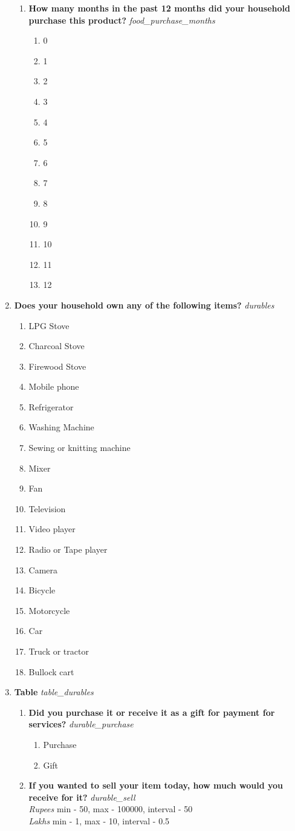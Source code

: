 \documentclass{article}
\begin{document}
\begin{enumerate}
\begin{enumerate}[label*=\arabic*.]
\item {\bfseries How many months in the past 12 months did your household purchase this product?}\emph{ food\_purchase\_months }
\begin{enumerate}
\item 0
\item 1
\item 2
\item 3
\item 4
\item 5
\item 6
\item 7
\item 8
\item 9
\item 10
\item 11
\item 12
\end{enumerate}
\end{enumerate}
\item {\bfseries Does your household own any of the following items?}\emph{ durables }
\begin{enumerate}
\item LPG Stove
\item Charcoal Stove
\item  Firewood Stove
\item Mobile phone
\item Refrigerator
\item Washing Machine
\item Sewing or knitting machine
\item Mixer
\item Fan
\item Television
\item Video player
\item Radio or Tape player
\item Camera
\item Bicycle
\item Motorcycle
\item Car
\item Truck or tractor
\item Bullock cart
\end{enumerate}
\item {\bfseries Table}\emph{ table\_durables }
\begin{enumerate}[label*=\arabic*.]
\item {\bfseries Did you purchase it or receive it as a gift for payment for services?}\emph{ durable\_purchase }
\begin{enumerate}
\item Purchase
\item Gift
\end{enumerate}
\item {\bfseries If you wanted to sell your item today, how much would you receive for it?}\emph{ durable\_sell }
\\ \emph{ Rupees }min - 50, max - 100000, interval - 50
\\ \emph{ Lakhs }min - 1, max - 10, interval - 0.5


\end{enumerate}
\end{enumerate}
\end{document}
